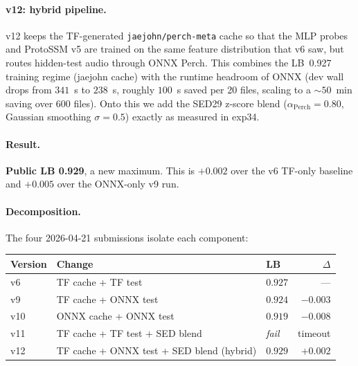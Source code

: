\paragraph{v12: hybrid pipeline.}
v12 keeps the TF-generated \texttt{jaejohn/perch-meta} cache so that
the MLP probes and ProtoSSM v5 are trained on the same feature
distribution that v6 saw, but routes hidden-test audio through
ONNX Perch. This combines the LB~0.927 training regime (jaejohn
cache) with the runtime headroom of ONNX (dev wall drops from
$341$~s to $238$~s, roughly $100$~s saved per 20 files, scaling to
a $\sim 50$~min saving over 600 files). Onto this we add the SED29
z-score blend ($\alpha_{\text{Perch}} = 0.80$, Gaussian smoothing
$\sigma = 0.5$) exactly as measured in exp34.

\paragraph{Result.}
\textbf{Public LB 0.929}, a new maximum. This is $+0.002$ over the
v6 TF-only baseline and $+0.005$ over the ONNX-only v9 run.

\paragraph{Decomposition.}
The four 2026-04-21 submissions isolate each component:

\begin{center}
\begin{tabular}{lllr}
\toprule
Version & Change & LB & $\Delta$ \\
\midrule
v6  & TF cache + TF test                         & $0.927$ & --- \\
v9  & TF cache + ONNX test                       & $0.924$ & $-0.003$ \\
v10 & ONNX cache + ONNX test                     & $0.919$ & $-0.008$ \\
v11 & TF cache + TF test + SED blend             & \emph{fail} & timeout \\
v12 & TF cache + ONNX test + SED blend (hybrid)  & $\mathbf{0.929}$ & $+0.002$ \\
\bottomrule
\end{tabular}
\end{center}

